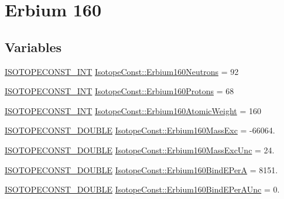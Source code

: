 \hypertarget{group___isotope_const-_erbium-_er160}{}\section{Erbium 160}
\label{group___isotope_const-_erbium-_er160}
\subsection*{Variables}
\begin{DoxyCompactItemize}
\item 
\mbox{\hyperlink{group___isotope_const-_macros_ga5f18360b3e99483a35c32d789e62621c}{I\+S\+O\+T\+O\+P\+E\+C\+O\+N\+S\+T\+\_\+\+I\+NT}} \mbox{\hyperlink{group___isotope_const-_erbium-_er160_ga1663c3917f864264e247655ed1f6f024}{Isotope\+Const\+::\+Erbium160\+Neutrons}} = 92
\item 
\mbox{\hyperlink{group___isotope_const-_macros_ga5f18360b3e99483a35c32d789e62621c}{I\+S\+O\+T\+O\+P\+E\+C\+O\+N\+S\+T\+\_\+\+I\+NT}} \mbox{\hyperlink{group___isotope_const-_erbium-_er160_ga648de51eef9760d1a993723ee6b8b873}{Isotope\+Const\+::\+Erbium160\+Protons}} = 68
\item 
\mbox{\hyperlink{group___isotope_const-_macros_ga5f18360b3e99483a35c32d789e62621c}{I\+S\+O\+T\+O\+P\+E\+C\+O\+N\+S\+T\+\_\+\+I\+NT}} \mbox{\hyperlink{group___isotope_const-_erbium-_er160_gae57ae87a922396ad154d681bd2a4a9cf}{Isotope\+Const\+::\+Erbium160\+Atomic\+Weight}} = 160
\item 
\mbox{\hyperlink{group___isotope_const-_macros_ga8f45a7272ce02c0b4c65c44636ed719a}{I\+S\+O\+T\+O\+P\+E\+C\+O\+N\+S\+T\+\_\+\+D\+O\+U\+B\+LE}} \mbox{\hyperlink{group___isotope_const-_erbium-_er160_ga1c1b4956d1cc6ea6e8c0c8324f713589}{Isotope\+Const\+::\+Erbium160\+Mass\+Exc}} = -\/66064.
\item 
\mbox{\hyperlink{group___isotope_const-_macros_ga8f45a7272ce02c0b4c65c44636ed719a}{I\+S\+O\+T\+O\+P\+E\+C\+O\+N\+S\+T\+\_\+\+D\+O\+U\+B\+LE}} \mbox{\hyperlink{group___isotope_const-_erbium-_er160_ga477dacddd921ac6e24e524122ecc1d7e}{Isotope\+Const\+::\+Erbium160\+Mass\+Exc\+Unc}} = 24.
\item 
\mbox{\hyperlink{group___isotope_const-_macros_ga8f45a7272ce02c0b4c65c44636ed719a}{I\+S\+O\+T\+O\+P\+E\+C\+O\+N\+S\+T\+\_\+\+D\+O\+U\+B\+LE}} \mbox{\hyperlink{group___isotope_const-_erbium-_er160_ga6bc2fa7eb10238dd5d0d135fb3d78bc7}{Isotope\+Const\+::\+Erbium160\+Bind\+E\+PerA}} = 8151.
\item 
\mbox{\hyperlink{group___isotope_const-_macros_ga8f45a7272ce02c0b4c65c44636ed719a}{I\+S\+O\+T\+O\+P\+E\+C\+O\+N\+S\+T\+\_\+\+D\+O\+U\+B\+LE}} \mbox{\hyperlink{group___isotope_const-_erbium-_er160_ga39b9e4a4cbf08e0672135df92d2ff4bd}{Isotope\+Const\+::\+Erbium160\+Bind\+E\+Per\+A\+Unc}} = 0.

\end{DoxyCompactItemize}
